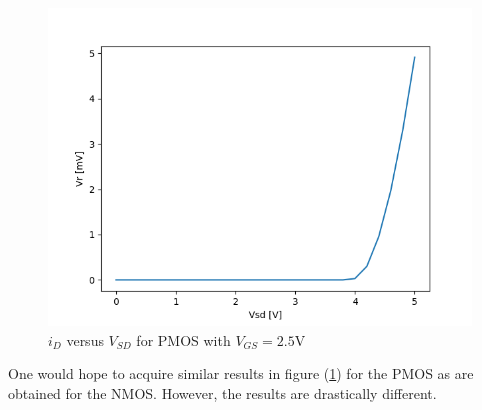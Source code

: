
\FloatBarrier

\begin{figure}[h!]
	\centering
	\includegraphics[scale=0.75]{../images/data_4.PNG}
	\caption{$i_{D}$ versus $V_{SD}$ for PMOS with $V_{GS} = 2.5$\si{\volt}}
	\label{fig:data_4}
\end{figure}

\FloatBarrier

One would hope to acquire similar results in figure (\ref{fig:data_4}) for the PMOS as are obtained for the NMOS.
However, the results are drastically different.

